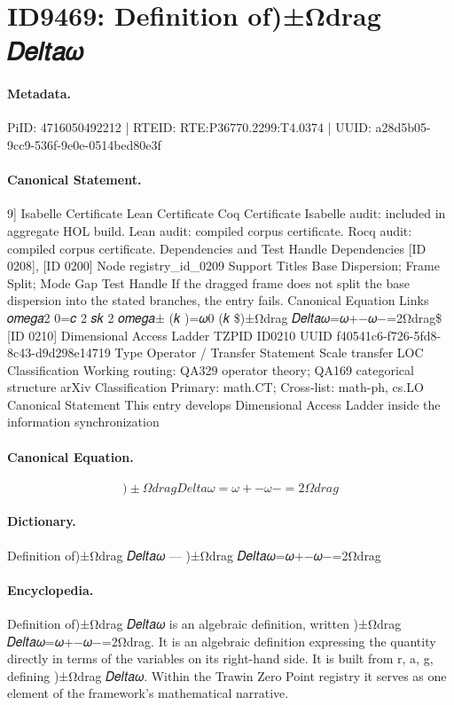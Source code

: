 \section*{ID9469: Definition of)±Ωdrag 𝐷𝑒𝑙𝑡𝑎𝜔}
\paragraph{Metadata.}
PiID: 4716050492212 | RTEID: RTE:P36770.2299:T4.0374 | UUID: a28d5b05-9cc9-536f-9e0e-0514bed80e3f

\paragraph{Canonical Statement.}
9] Isabelle Certificate Lean Certificate Coq Certificate Isabelle audit: included in aggregate HOL build. Lean audit: compiled corpus certificate. Rocq audit: compiled corpus certificate. Dependencies and Test Handle Dependencies [ID 0208], [ID 0200] Node registry\_id\_0209 Support Titles Base Dispersion; Frame Split; Mode Gap Test Handle If the dragged frame does not split the base dispersion into the stated branches, the entry fails. Canonical Equation Links 𝑜𝑚𝑒𝑔𝑎2 0=𝑐 2 𝑠𝑘 2 𝑜𝑚𝑒𝑔𝑎± (𝑘 )=𝜔0 (𝑘 \$)±Ωdrag 𝐷𝑒𝑙𝑡𝑎𝜔=𝜔+−𝜔−=2Ωdrag\$ [ID 0210] Dimensional Access Ladder TZPID ID0210 UUID f40541c6-f726-5fd8-8c43-d9d298e14719 Type Operator / Transfer Statement Scale transfer LOC Classification Working routing: QA329 operator theory; QA169 categorical structure arXiv Classification Primary: math.CT; Cross-list: math-ph, cs.LO Canonical Statement This entry develops Dimensional Access Ladder inside the information synchronization

\paragraph{Canonical Equation.}
\[
)±Ωdrag 𝐷𝑒𝑙𝑡𝑎𝜔=𝜔+−𝜔−=2Ωdrag
\]

\paragraph{Dictionary.}
Definition of)±Ωdrag 𝐷𝑒𝑙𝑡𝑎𝜔 — )±Ωdrag 𝐷𝑒𝑙𝑡𝑎𝜔=𝜔+−𝜔−=2Ωdrag

\paragraph{Encyclopedia.}
Definition of)±Ωdrag 𝐷𝑒𝑙𝑡𝑎𝜔 is an algebraic definition, written )±Ωdrag 𝐷𝑒𝑙𝑡𝑎𝜔=𝜔+−𝜔−=2Ωdrag. It is an algebraic definition expressing the quantity directly in terms of the variables on its right-hand side. It is built from r, a, g, defining )±Ωdrag 𝐷𝑒𝑙𝑡𝑎𝜔. Within the Trawin Zero Point registry it serves as one element of the framework's mathematical narrative.
